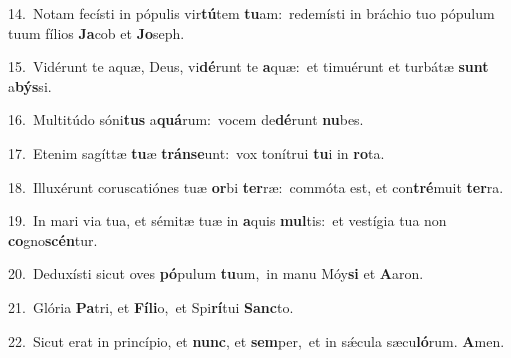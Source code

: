 {\numbfont\textcolor{\numbcolor}{14.}}~Notam fecísti in pópulis vir\-\textbf{tú}\-tem \textbf{tu}\-am:~\star redemísti in bráchio tuo pópulum tuum fílios \textbf{Ja}\-cob et \textbf{Jo}\-seph.\par
{\numbfont\textcolor{\numbcolor}{15.}}~Vidérunt te aquæ, Deus, vi\-\textbf{dé}\-runt te \textbf{a}\-quæ:~\star et timuérunt et turbátæ \textbf{sunt} a\-\textbf{býs}\-si.\par
{\numbfont\textcolor{\numbcolor}{16.}}~Multitúdo sóni\textbf{tus} a\-\textbf{quá}\-rum:~\star vocem de\-\textbf{dé}\-runt \textbf{nu}\-bes.\par
{\numbfont\textcolor{\numbcolor}{17.}}~Etenim sagíttæ \textbf{tu}\-æ \textbf{tráns}\-\textbf{e}unt:~\star vox tonítrui \textbf{tu}\-i in \textbf{ro}\-ta.\par
{\numbfont\textcolor{\numbcolor}{18.}}~Illuxérunt coruscatiónes tuæ \textbf{or}\-bi \textbf{ter}\-ræ:~\star commóta est, et con\-\textbf{tré}\-muit \textbf{ter}\-ra.\par
{\numbfont\textcolor{\numbcolor}{19.}}~In mari via tua, et sémitæ tuæ in \textbf{a}\-quis \textbf{mul}\-tis:~\star et vestígia tua non \textbf{co}\-gno\-\textbf{scén}\-tur.\par
{\numbfont\textcolor{\numbcolor}{20.}}~Deduxísti sicut oves \textbf{pó}\-pulum \textbf{tu}\-um,~\star in manu Móy\textbf{si} et \textbf{A}\-aron.\par
{\numbfont\textcolor{\numbcolor}{21.}}~Glória \textbf{Pa}\-tri, et \textbf{Fí}\-\textbf{li}o,~\star et Spi\-\textbf{rí}\-tui \textbf{Sanc}\-to.\par
{\numbfont\textcolor{\numbcolor}{22.}}~Sicut erat in princípio, et \textbf{nunc}\-, et \textbf{sem}\-per,~\star et in sǽcula sæcu\-\textbf{ló}\-rum. \textbf{A}\-men.\par
